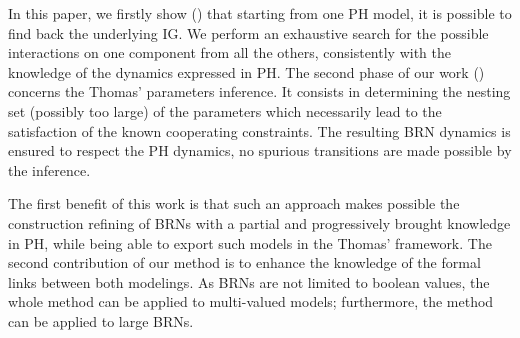 In this paper, we firstly show () that starting from one PH model, it is possible to find back the underlying IG.
We perform an exhaustive search for the possible interactions on one component from all the
others, consistently with the knowledge of the dynamics expressed in PH.
The second phase of our work () concerns the Thomas' parameters inference.
It consists in determining the nesting set (possibly too large) of the parameters which necessarily
lead to the satisfaction of the known cooperating constraints.
The resulting BRN dynamics is ensured to respect the PH dynamics, \ie no spurious transitions are
made possible by the inference.

The first benefit of this work is that such an approach makes possible the construction refining of BRNs with a partial and progressively brought knowledge in PH, while being able to export such models in the Thomas' framework.
The second contribution of our method is to enhance the knowledge of the formal links between both modelings.
As BRNs are not limited to boolean values, the whole method can be applied to multi-valued models;
furthermore, the method can be applied to large BRNs.

\begin{comment}
\paragraph{Outline.}
\pref{sec:frameworks} recalls the PH and Thomas frameworks;
\pref{sec:infer-IG} defines the IG inference from PH;
\pref{sec:infer-K} details the enumeration of Thomas parametrizations compatible with a PH;
\pref{sec:examples} gives some information about the implementation of the method.
\end{comment}
